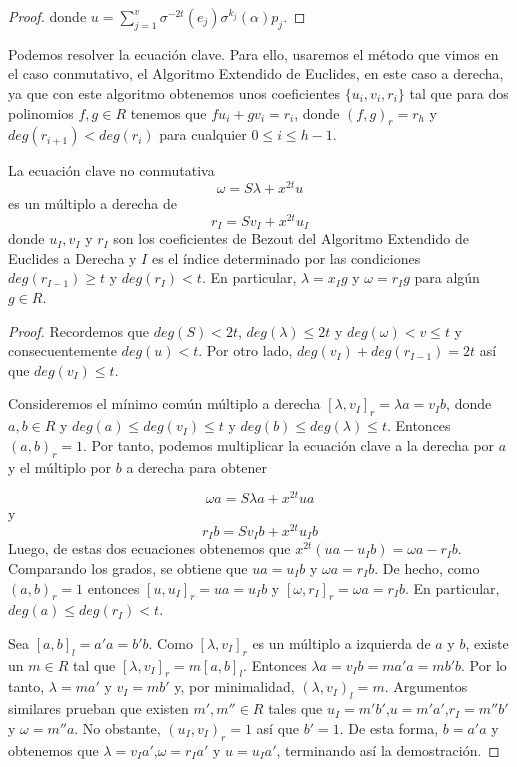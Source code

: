 \begin{proof}
donde $u = \sum_{j=1}^v \sigma^{-2t}(e_j)\sigma^{k_j}(\alpha)p_j $.
\end{proof}

Podemos resolver la ecuación clave. Para ello, usaremos el método que vimos en el caso conmutativo, el Algoritmo Extendido de Euclides, en este caso a derecha, ya que con este algoritmo obtenemos unos coeficientes $\{u_i,v_i,r_i\}$ tal que para dos polinomios $f,g \in R$ tenemos que $fu_i + g v_i = r_i$, donde $(f,g)_r = r_h$ y $deg(r_{i+1}) < deg(r_i)$ para cualquier $0 \leq i \leq h-1$.

\begin{theorem}
\label{th:ec-nc}
    La ecuación clave no conmutativa 
    \[ \omega = S\lambda + x^{2t}u\]
es un múltiplo a derecha de 
    \[ r_I = Sv_I + x^{2t}u_I\]
donde $u_I,v_I$ y $r_I$ son los coeficientes de Bezout del Algoritmo Extendido de Euclides a Derecha y $I$ es el índice determinado por las condiciones $deg(r_{I-1}) \geq t $ y $deg(r_I) < t$. En particular, $\lambda = x_Ig$ y $\omega = r_Ig$ para algún $g \in R$.
\end{theorem}

\begin{proof}
  Recordemos que $deg(S) < 2t$, $deg(\lambda) \leq 2t$ y $deg(\omega) < v \leq t$ y consecuentemente $deg(u) < t$. Por otro lado, $deg(v_I)+deg(r_{I-1}) = 2t$ así que $deg(v_I) \leq t$.

  Consideremos el mínimo común múltiplo a derecha $[\lambda,v_I]_r = \lambda a = v_I b$, donde $a,b \in R$ y $deg(a) \leq deg(v_I) \leq t$ y $deg(b) \leq deg(\lambda) \leq t$. Entonces $(a,b)_r = 1$. Por tanto, podemos multiplicar la ecuación clave a la derecha por $a$ y el múltiplo por $b$ a derecha para obtener
  
 \[ \omega a = S\lambda a + x^{2t}ua\]
y
    \[ r_I b = Sv_I b + x^{2t}u_I b\]
Luego, de estas dos ecuaciones obtenemos que $x^{2t}(ua-u_Ib) = \omega a - r_Ib$. Comparando los grados, se obtiene que $ua = u_Ib$ y $\omega a = r_I b$. De hecho, como $(a,b)_r = 1$ entonces $[u,u_I]_r = ua = u_I b$ y $[\omega,r_I]_r = \omega a = r_I b$. En particular, $deg(a) \leq deg(r_I) < t$.

Sea $[a,b]_l = a'a = b'b$. Como $[\lambda,v_I]_r$ es un múltiplo a izquierda de $a$ y $b$, existe un $m \in R$ tal que $[\lambda,v_I]_r = m [a,b]_l $. Entonces $\lambda a = v_I b = ma'a = mb'b$. Por lo tanto, $\lambda = ma'$ y $v_I = mb'$ y, por minimalidad, $(\lambda,v_I)_l = m$. Argumentos similares prueban que existen $m',m'' \in R $ tales que $u_I =m'b'$,$u = m'a'$,$r_I = m''b'$ y $\omega = m''a$. No obstante, $(u_I,v_I)_r = 1$ así que $b' = 1$. De esta forma, $b = a'a$ y obtenemos que $\lambda = v_I a'$,$\omega = r_I a'$ y $u = u_I a'$, terminando así la demostración.
\end{proof}



